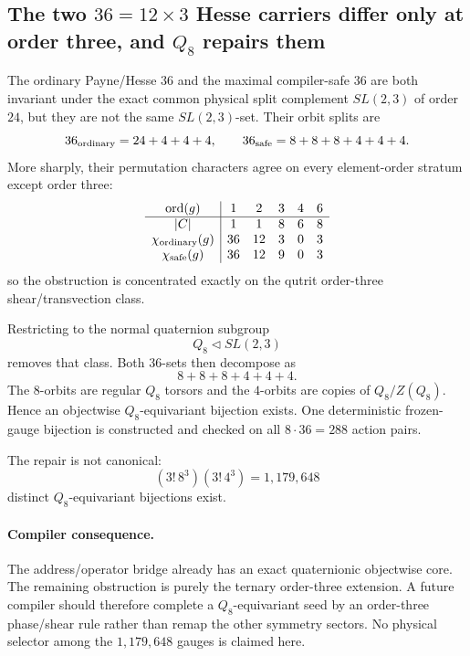 \subsection*{The two $36=12\times3$ Hesse carriers differ only at order three, and $Q_8$ repairs them}

The ordinary Payne/Hesse $36$ and the maximal compiler-safe $36$ are both
invariant under the exact common physical split complement
$SL(2,3)$ of order $24$, but they are not the same $SL(2,3)$-set.  Their orbit
splits are
\[
36_{\rm ordinary}=24+4+4+4,
\qquad
36_{\rm safe}=8+8+8+4+4+4.
\]
More sharply, their permutation characters agree on every element-order
stratum except order three:
\[
\begin{array}{c|ccccc}
\operatorname{ord}(g)&1&2&3&4&6\\ \hline
|C|&1&1&8&6&8\\
\chi_{\rm ordinary}(g)&36&12&3&0&3\\
\chi_{\rm safe}(g)&36&12&9&0&3
\end{array}
\]
so the obstruction is concentrated exactly on the qutrit order-three
shear/transvection class.

Restricting to the normal quaternion subgroup
\[
Q_8\triangleleft SL(2,3)
\]
removes that class.  Both $36$-sets then decompose as
\[
\boxed{8+8+8+4+4+4.}
\]
The $8$-orbits are regular $Q_8$ torsors and the $4$-orbits are copies of
$Q_8/Z(Q_8)$.  Hence an objectwise $Q_8$-equivariant bijection exists.
One deterministic frozen-gauge bijection is constructed and checked on all
$8\cdot36=288$ action pairs.

The repair is not canonical:
\[
\boxed{
(3!\,8^3)(3!\,4^3)=1{,}179{,}648
}
\]
distinct $Q_8$-equivariant bijections exist.

\paragraph{Compiler consequence.}
The address/operator bridge already has an exact quaternionic objectwise core.
The remaining obstruction is purely the ternary order-three extension.  A
future compiler should therefore complete a $Q_8$-equivariant seed by an
order-three phase/shear rule rather than remap the other symmetry sectors.
No physical selector among the $1{,}179{,}648$ gauges is claimed here.
